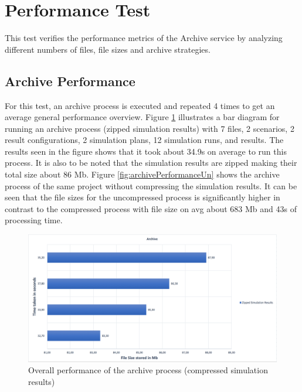 \section{Performance Test}
This test verifies the performance metrics of the Archive service by analyzing different numbers of files, file sizes and archive strategies.

\subsection{Archive Performance}
For this test, an archive process is executed and repeated 4 times to get an average general performance overview. Figure \ref{fig:archivePerformance} illustrates a bar diagram for running an archive process (zipped simulation results) with 7 files, 2 scenarios, 2 result configurations, 2 simulation plans,
12 simulation runs, and results. The results seen in the figure shows that it took about 34.9s on average to run this process. It is also to be noted that the
simulation results are zipped making their total size about 86 Mb. Figure \ref{fig:archivePerformanceUn} shows the archive process of the same project without 
compressing the simulation results. It can be seen that the file sizes for the uncompressed process is significantly higher in contrast to the compressed
process with file size on avg about 683 Mb and 43s of processing time.

\begin{figure}[H]
    \centering \includegraphics[scale=0.45]{grafiken/archiveZip.png}
    \caption{Overall performance of the archive process (compressed simulation results)}
    \label{fig:archivePerformance}
\end{figure}

